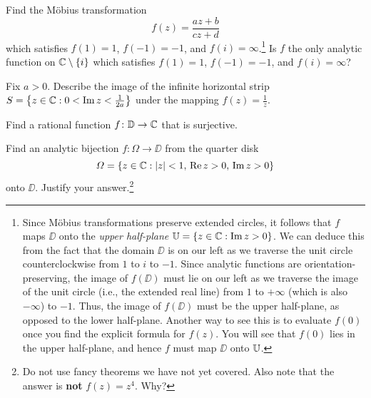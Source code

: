 \documentclass{../math135}
\begin{document}
\begin{exercise}
	Find the M\"obius transformation
  \[
    f(z) = \frac{az+b}{cz+d}
  \]
  which satisfies \(f(1) = 1\), \(f(-1) = -1\), and
  \(f(i) = \infty\).\footnote{Since M\"obius transformations preserve
    extended circles, it follows that \(f\) maps \(\DD\) onto the
    \emph{upper half-plane} \(\UU = \{z \in \CC: \Im z > 0\}\).  We
    can deduce this from the fact that the domain \(\DD\) is on our
    left as we traverse the unit circle counterclockwise from \(1\) to
    \(i\) to \(-1\).  Since analytic functions are
    orientation-preserving, the image of \(f(\DD)\) must lie on our
    left as we traverse the image of the unit circle (i.e., the
    extended real line) from \(1\) to \(+\infty\) (which is also
    \(-\infty\)) to \(-1\).  Thus, the image of \(f(\DD)\) must be the
    upper half-plane, as opposed to the lower half-plane.  Another way
    to see this is to evaluate \(f(0)\) once you find the explicit
    formula for \(f(z)\).  You will see that \(f(0)\) lies in the
    upper half-plane, and hence \(f\) must map \(\DD\) onto \(\UU\).}
  Is \(f\) the only analytic function on \(\CC \setminus \set i\)
  which satisfies \(f(1) = 1\), \(f(-1) = -1\), and \(f(i) = \infty\)?
\end{exercise}


\begin{exercise}
	Fix \(a > 0\).  Describe the image of the infinite horizontal strip
  \(S= \set*{z \in \CC : 0 < \Im z < \frac{1}{2a}}\) under the mapping
  \(f(z) = \frac 1 z\).
\end{exercise}


\begin{exercise}
	Find a rational function \(f \colon \DD\to\CC\) that is surjective.
\end{exercise}

\begin{exercise}
	Find an analytic bijection \(f \colon \Omega\to\DD\) from the
  quarter disk
  \[
		\Omega = \set*{ z \in \CC
      : \abs z < 1, \, \Re z > 0, \, \Im z > 0 }
  \]
	onto \(\DD\).  Justify your answer.\footnote{Do not use fancy
    theorems we have not yet covered.  Also note that the answer is
    \textbf{not} \(f(z)=z^4\).  Why?}
\end{exercise}
\end{document}
